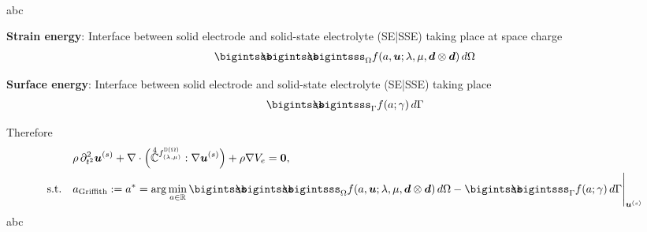 \documentclass[25pt, a0paper,
portrait,
margin=2mm, 
innermargin=2mm, 
blockverticalspace=7mm, %
colspace=2mm, %
subcolspace=0mm]{tikzposter}
\begin{document}
{\begin{minipage}{0.43\textwidth}
\begin{mdframed}
\begin{align*}
			\end{align*}
			abc
		\end{mdframed}
		\begin{minipage}{0.5\textwidth}
			\begin{mdframed}
				\textbf{Strain energy}: 
				Interface between solid electrode and solid-state electrolyte (SE|SSE) 
				taking place at space charge
				\begin{align*}
					\bigintsss\!\!\!\!\!\!\bigintsss\!\!\!\!\!\!\bigintsss_{\Omega}
					f(a,\bm{u};\lambda,\mu,\bm{d}\otimes\bm{d}) \, d\Omega 
				\end{align*}
			\end{mdframed}
		\end{minipage}
		\hfill 
		\begin{minipage}{0.49\textwidth}
			\begin{mdframed}
				\textbf{Surface energy}: 
				Interface between solid electrode and solid-state electrolyte (SE|SSE) 
				taking place 
				\begin{align*} 
					\bigintsss\!\!\!\!\!\!\bigintsss_{\Gamma} f(a;\gamma) \, d\Gamma
				\end{align*}
			\end{mdframed}
		\end{minipage}
		\begin{mdframed}
			Therefore
			\begin{align*}
				 & \rho\,
				\partial^2_{t^2}
				\bm{u}^{(s)}
				+
				\nabla \cdot
				\Big(
				\accentset{\scriptstyle 4}{\mathbb{C}}^{f^{\mathbb{D}(\Omega)}_{(\lambda,\mu)}}
				:\nabla\Bu^{(s)}
				\Big)
				+
				\rho\nabla V_{e}
				= \textbf{0},                                                                                                                                                                                                                                                               \\
				\text{s.t.}\quad
				 & a_{\text{Griffith}} := a^{*} = \arg\min_{a\in\mathbb{R}}{\bigintsss\!\!\!\!\!\!\bigintsss\!\!\!\!\!\!\bigintsss_{\Omega} f(a,\bm{u};\lambda,\mu,\bm{d}\otimes\bm{d}) \, d\Omega - \bigintsss\!\!\!\!\!\!\bigintsss_{\Gamma} f(a;\gamma) \, d\Gamma}\Bigg|_{\bm{u}^{(s)}}
			\end{align*}
			abc
		\end{mdframed}
	\end{minipage}
	\hfill
	\begin{minipage}{0.54\textwidth}
		\begin{minipage}{0.7\textwidth}

\end{minipage}
\end{minipage}}
\end{document}
